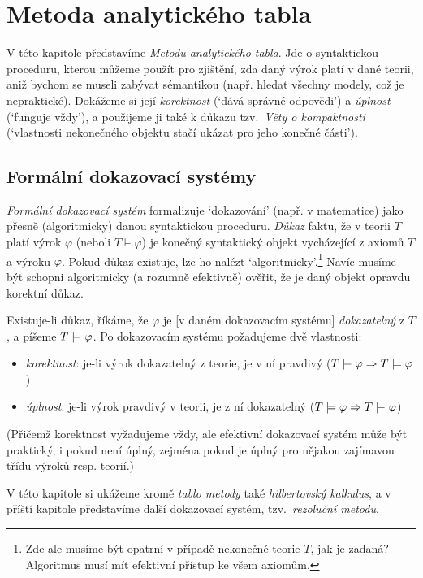 \chapter{Metoda analytického tabla}
\label{chapter:tableau-method-propositional}

V této kapitole představíme \emph{Metodu analytického tabla}. Jde o syntaktickou proceduru, kterou můžeme použít pro zjištění, zda daný výrok platí v dané teorii, aniž bychom se museli zabývat sémantikou (např. hledat všechny modely, což je nepraktické). Dokážeme si její \emph{korektnost} (`dává správné odpovědi') a \emph{úplnost} (`funguje vždy'), a použijeme ji také k důkazu tzv.\ \emph{Věty o kompaktnosti} (`vlastnosti nekonečného objektu stačí ukázat pro jeho konečné části').

\section{Formální dokazovací systémy}

\emph{Formální dokazovací systém} formalizuje `dokazování' (např. v matematice) jako přesně (algoritmicky) danou syntaktickou proceduru. \emph{Důkaz} faktu, že v teorii $T$ platí výrok $\varphi$ (neboli $T\models\varphi$) je konečný syntaktický objekt vycházející z axiomů $T$ a výroku $\varphi$. Pokud důkaz existuje, lze ho nalézt `algoritmicky'.\footnote{Zde ale musíme být opatrní v případě nekonečné teorie $T$, jak je zadaná? Algoritmus musí mít efektivní přístup ke všem axiomům.} Navíc musíme být schopni algoritmicky (a rozumně efektivně) ověřit, že je daný objekt opravdu korektní důkaz.

Existuje-li důkaz, říkáme, že $\varphi$ je [v daném dokazovacím systému] \emph{dokazatelný} z $T$, a píšeme $T\proves\varphi$. Po dokazovacím systému požadujeme dvě vlastnosti:
\begin{itemize}
    \item \emph{korektnost}: je-li výrok dokazatelný z teorie, je v ní pravdivý ($T\proves\varphi\Rightarrow T\models\varphi$)
    \item \emph{úplnost}: je-li výrok pravdivý v teorii, je z ní dokazatelný ($T\models\varphi\Rightarrow T\proves\varphi$)
\end{itemize}
(Přičemž korektnost vyžadujeme vždy, ale efektivní dokazovací systém může být praktický, i pokud není úplný, zejména pokud je úplný pro nějakou zajímavou třídu výroků resp. teorií.)

V této kapitole si ukážeme kromě \emph{tablo metody} také \emph{hilbertovský kalkulus}, a v příští kapitole představíme další dokazovací systém, tzv.\ \emph{rezoluční metodu}.


